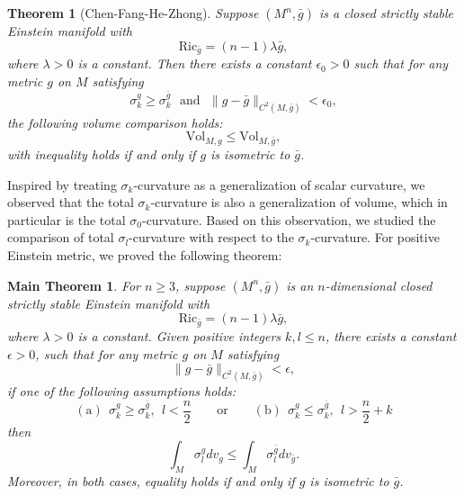 \documentclass[12pt]{amsart}
\newtheorem{theor}{Theorem}[section]
\newtheorem{theorem}{Main Theorem}
\newcommand{\bg}{\bar{g}}
\numberwithin{equation}{section}
\begin{document}
\begin{theor}[Chen-Fang-He-Zhong\cite{2025Volume}]\label{theorem: CFHZ}
    Suppose $(M^n,\bg)$ is a closed strictly stable Einstein manifold with\begin{equation*}
        \mathrm{Ric}_{\bg} = (n-1) \lambda \bg,
    \end{equation*}
    where $\lambda>0$ is a constant. Then there exists a constant $\epsilon_0>0$ such that for any metric $g$ on $M$ satisfying\begin{equation*}
        \sigma_k^g\geq \sigma_k^{\bg}\ \ \ \mathrm{and}\ \ \ \|g-\bg\|_{C^2(M,\bg)}<\epsilon_0,
    \end{equation*}
    the following volume comparison holds:
    \begin{equation*}
        \mathrm{Vol}_{M,g} \leq \mathrm{Vol}_{M,\bg},
    \end{equation*}
    with inequality holds if and only if $g$ is isometric to $\bg$.
\end{theor}

Inspired by treating $\sigma_k$-curvature as a generalization of scalar curvature, we observed that the total $\sigma_k$-curvature is also a generalization of volume, which in particular is the total $\sigma_0$-curvature. Based on this observation, we studied the comparison of total $\sigma_l$-curvature with respect to the $\sigma_k$-curvature. For positive Einstein metric, we proved the following theorem:
\begin{theorem}\label{theorem: main_A}
For $n \geq 3$, suppose $(M^n,\bg)$ is an $n$-dimensional closed strictly stable Einstein manifold with
    \begin{equation*}
        \mathrm{Ric}_{\bg} = (n-1) \lambda \bg,
    \end{equation*} 
    where $\lambda > 0$ is a constant. Given positive integers $k, l \leq n$, there exists a constant $\epsilon>0$, such that for any metric $g$ on $M$ satisfying 
    \begin{equation*}
        \|g-\bg\|_{C^2(M,\bg)}<\epsilon,
    \end{equation*}
    if one of the following assumptions holds:
    \begin{equation*}
        \mathrm{(a)}\ \ \sigma_k^g \geq \sigma_k^{\bg}, \ \ l< \frac{n}{2}\qquad\mathrm{or}\qquad\mathrm{(b)}\ \  \sigma_k^g \leq \sigma_k^{\bg}, \ \ l > \frac{n}{2} + k
    \end{equation*}
    then
    \begin{equation*}
        \int_M\sigma_l^gdv_g\leq\int_M\sigma_l^{\bg}dv_{\bg}.
    \end{equation*}
    Moreover, in both cases, equality holds if and only if $g$ is isometric to $\bg$.
\end{theorem}
\end{document}
